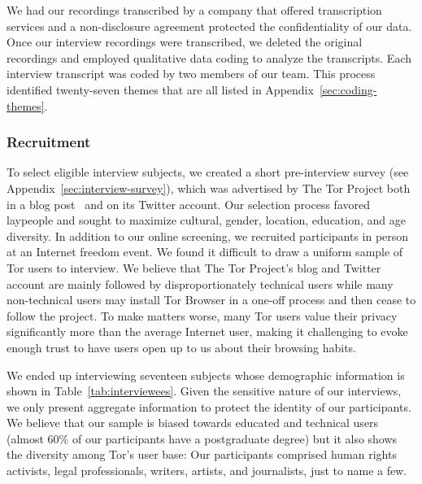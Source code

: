 We had our recordings transcribed by a company that offered transcription
services and a non-disclosure agreement protected the confidentiality of our
data.  Once our interview recordings were transcribed, we deleted the
original recordings and employed qualitative data coding to analyze the
transcripts.  Each interview transcript was coded by two members of our team.
This process identified twenty-seven themes that are all listed in
Appendix~\ref{sec:coding-themes}.

\subsubsection{Recruitment}

To select eligible interview subjects, we created a short pre-interview survey
(see Appendix~\ref{sec:interview-survey}), which was advertised by The Tor
Project both in a blog post~\cite{Winter2017a} and on its Twitter account.  Our
selection process favored laypeople and sought to maximize cultural, gender,
location, education, and age diversity.  In addition to our online screening, we
recruited participants in person at an Internet freedom event.  We found it
difficult to draw a uniform sample of Tor users to interview. We believe that
The Tor Project's blog and Twitter account are mainly followed by
disproportionately technical users while many non-technical users may install
Tor Browser in a one-off process and then cease to follow the project.  To make
matters worse, many Tor users value their privacy significantly more than the
average Internet user, making it challenging to evoke enough trust to have users
open up to us about their browsing habits.

We ended up interviewing seventeen subjects whose demographic information is
shown in Table~\ref{tab:interviewees}.  Given the sensitive nature of our
interviews, we only present aggregate information to protect the identity of our
participants.  We believe that our sample is biased towards educated and
technical users (almost 60\% of our participants have a postgraduate degree) but
it also shows the diversity among Tor's user base: Our participants comprised
human rights activists, legal professionals, writers, artists, and journalists,
just to name a few.

